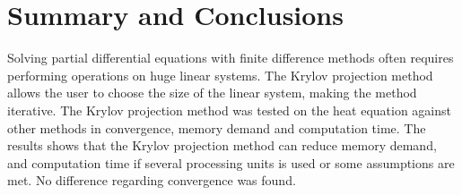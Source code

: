 \section*{Summary and Conclusions}
Solving partial differential equations with finite difference methods often requires performing operations on huge linear systems. The Krylov projection method allows the user to choose the size of the linear system, making the method iterative. The Krylov projection method was tested on the heat equation against other methods in convergence, memory demand and computation time. The results shows that the Krylov projection method can reduce memory demand, and computation time if several processing units is used or some assumptions are met. No difference regarding convergence was found.